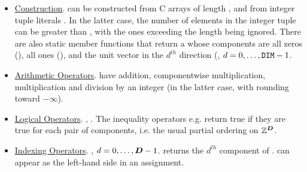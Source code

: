 \documentclass[12pt]{article}
\begin{document}
\begin{itemize}
\item
\underline{Construction}.  can be constructed from C arrays of length , and from integer tuple literals . In the latter case, the number of elements in the integer tuple can be greater than , with the ones exceeding the length being ignored. There are also static member functions that return a  whose components are all zeros (), all ones (), and the unit vector in the $d^{th}$ direction (, $d = 0, \dots , \hbox{\texttt{DIM}}-1$.
 
\item
\underline{Arithmetic Operators}. 
 have addition, componentwise multiplication, multiplication and division by an integer (in the latter case, with rounding toward $-\infty$).
\item
\underline{Logical Operators}.
, . The inequality operators e.g.  return true if they are true for each pair of components, i.e. the usual partial ordering on $\mathbb{Z}^{\boldsymbol{D}}$.
\item
\underline{Indexing Operators}.
, $d = 0, \dots , {\boldsymbol{D}}-1 $. returns the $d^{th}$ component of .  can appear as the left-hand side in an assignment.
\end{itemize}
%
%
%
%
\end{document}
